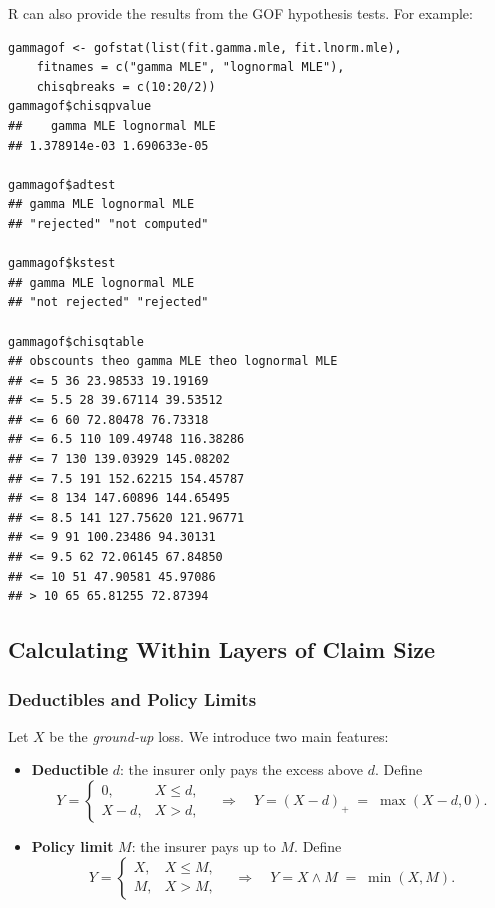 \documentclass[11pt]{article}
\newcommand{\noi}{\noindent}
\begin{document}
\noi R can also provide the results from the GOF hypothesis tests. For example:
\begin{lstlisting}
gammagof <- gofstat(list(fit.gamma.mle, fit.lnorm.mle),
    fitnames = c("gamma MLE", "lognormal MLE"),
    chisqbreaks = c(10:20/2))
gammagof$chisqpvalue
##    gamma MLE lognormal MLE
## 1.378914e-03 1.690633e-05

gammagof$adtest
## gamma MLE lognormal MLE
## "rejected" "not computed"

gammagof$kstest
## gamma MLE lognormal MLE
## "not rejected" "rejected"

gammagof$chisqtable
## obscounts theo gamma MLE theo lognormal MLE
## <= 5 36 23.98533 19.19169
## <= 5.5 28 39.67114 39.53512
## <= 6 60 72.80478 76.73318
## <= 6.5 110 109.49748 116.38286
## <= 7 130 139.03929 145.08202
## <= 7.5 191 152.62215 154.45787
## <= 8 134 147.60896 144.65495
## <= 8.5 141 127.75620 121.96771
## <= 9 91 100.23486 94.30131
## <= 9.5 62 72.06145 67.84850
## <= 10 51 47.90581 45.97086
## > 10 65 65.81255 72.87394
\end{lstlisting}

\subsection{Calculating Within Layers of Claim Size}
\subsubsection{Deductibles and Policy Limits}

Let \(X\) be the \emph{ground‐up} loss.  We introduce two main features:

\begin{itemize}
  \item \textbf{Deductible} \(d\): the insurer only pays the excess above \(d\).  Define
  \[
    Y = 
    \begin{cases}
      0,             & X \le d,\\
      X - d,         & X > d,
    \end{cases}
    \quad\Longrightarrow\quad
    Y = (X - d)_{+} \;=\;\max(X - d,0).
  \]
  \item \textbf{Policy limit} \(M\): the insurer pays up to \(M\).  Define
  \[
    Y =
    \begin{cases}
      X,             & X \le M,\\
      M,             & X > M,
    \end{cases}
    \quad\Longrightarrow\quad
    Y = X \wedge M \;=\;\min(X,M).
  \]
\end{itemize}
\end{document}
